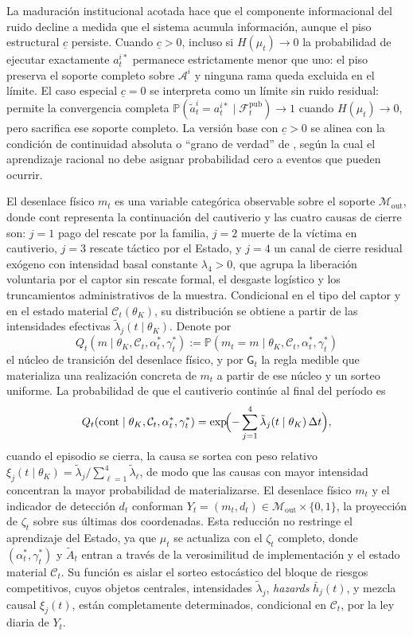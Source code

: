 \documentclass[review,authoryear,12pt]{elsarticle}
\theoremstyle{plain}
\theoremstyle{definition}
\newcommand{\Prob}{\mathbb{P}}
\newcommand{\1}{\mathbf{1}}
\begin{document}
La maduración institucional acotada hace que el componente informacional del ruido decline a medida que el sistema acumula información, aunque el piso estructural $\underline{c}$ persiste. Cuando $\underline{c}>0$, incluso si $H(\mu_t)\to 0$ la probabilidad de ejecutar exactamente $a_t^{i\ast}$ permanece estrictamente menor que uno: el piso preserva el soporte completo sobre $\mathcal{A}^i$ y ninguna rama queda excluida en el límite. El caso especial $\underline{c}=0$ se interpreta como un límite sin ruido residual: permite la convergencia completa $\Prob(\tilde{a}_t^i=a_t^{i\ast}\mid\mathcal{F}_t^{\mathrm{pub}})\to 1$ cuando $H(\mu_t)\to 0$, pero sacrifica ese soporte completo. La versión base con $\underline{c}>0$ se alinea con la condición de continuidad absoluta o ``grano de verdad'' de \citet{KalaiLehrer1993}, según la cual el aprendizaje racional no debe asignar probabilidad cero a eventos que pueden ocurrir.

El desenlace físico $m_t$ es una variable categórica observable sobre el soporte $\mathcal{M}_{\mathrm{out}}$, donde $\mathrm{cont}$ representa la continuación del cautiverio y las cuatro causas de cierre son: $j=1$ pago del rescate por la familia, $j=2$ muerte de la víctima en cautiverio, $j=3$ rescate táctico por el Estado, y $j=4$ un canal de cierre residual exógeno con intensidad basal constante $\lambda_4>0$, que agrupa la liberación voluntaria por el captor sin rescate formal, el desgaste logístico y los truncamientos administrativos de la muestra. Condicional en el tipo del captor y en el estado material $\mathcal{C}_t(\theta_K)$, su distribución se obtiene a partir de las intensidades efectivas $\tilde{\lambda}_j(t\mid\theta_K)$. Denote por
\[
Q_t(m\mid\theta_K,\mathcal{C}_t,\alpha_t^\ast,\gamma_t^\ast)
:=\Prob(m_t=m\mid\theta_K,\mathcal{C}_t,\alpha_t^\ast,\gamma_t^\ast)
\]
el núcleo de transición del desenlace físico, y por $\mathsf{G}_t$ la regla medible que materializa una realización concreta de $m_t$ a partir de ese núcleo y un sorteo uniforme. La probabilidad de que el cautiverio continúe al final del período es
\[
Q_t(\mathrm{cont}\mid\theta_K,\mathcal{C}_t,\alpha_t^\ast,\gamma_t^\ast)=\exp\!\Bigl(-\sum_{j=1}^{4}\tilde{\lambda}_j(t\mid\theta_K)\,\Delta t\Bigr),
\]
cuando el episodio se cierra, la causa se sortea con peso relativo $\xi_j(t\mid\theta_K)=\tilde{\lambda}_j/\sum_{\ell=1}^{4}\tilde{\lambda}_\ell$, de modo que las causas con mayor intensidad concentran la mayor probabilidad de materializarse. El desenlace físico $m_t$ y el indicador de detección $d_t$ conforman $Y_t=(m_t,d_t)\in\mathcal{M}_{\mathrm{out}}\times\{0,1\}$, la proyección de $\zeta_t$ sobre sus últimas dos coordenadas. Esta reducción no restringe el aprendizaje del Estado, ya que $\mu_t$ se actualiza con el $\zeta_t$ completo, donde $(\alpha_t^\ast,\gamma_t^\ast)$ y $\tilde{A}_t$ entran a través de la verosimilitud de implementación y el estado material $\mathcal{C}_t$. Su función es aislar el sorteo estocástico del bloque de riesgos competitivos, cuyos objetos centrales, intensidades $\tilde{\lambda}_j$, \textit{hazards} $\bar{h}_j(t)$, y mezcla causal $\xi_j(t)$, están completamente determinados, condicional en $\mathcal{C}_t$, por la ley diaria de $Y_t$.
\end{document}
